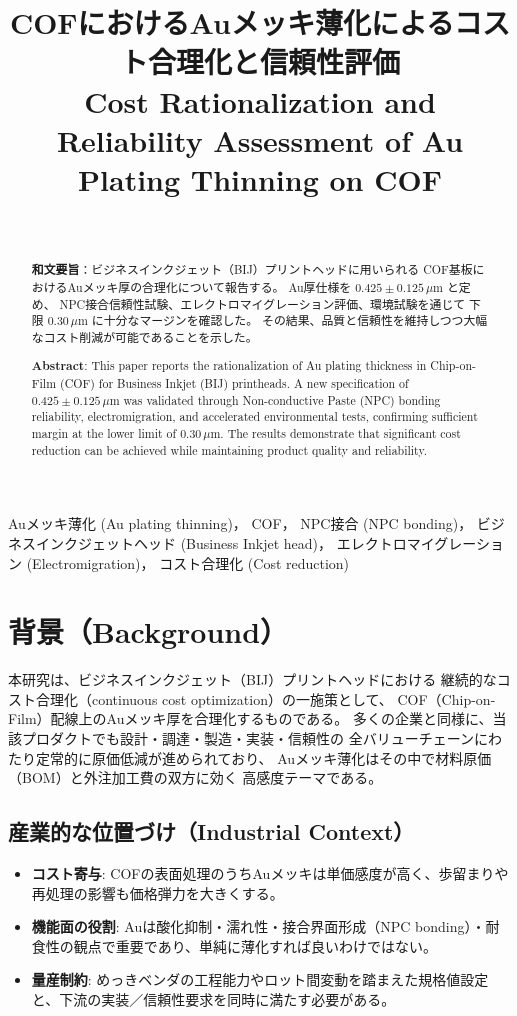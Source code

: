 \documentclass[conference]{IEEEtran}
\title{COFにおけるAuメッキ薄化によるコスト合理化と信頼性評価\\
\large Cost Rationalization and Reliability Assessment of Au Plating Thinning on COF}
\author{%
  \IEEEauthorblockN{三溝 真一（Shinichi Samizo)}\\
  \IEEEauthorblockA{独立系半導体研究者（元セイコーエプソン）\\
  Email: \href{mailto:shin3t72@gmail.com}{shin3t72@gmail.com}\\
  GitHub: \url{https://github.com/Samizo-AITL}}%
}
\begin{document}
\maketitle

\begin{abstract}
\textbf{和文要旨}：ビジネスインクジェット（BIJ）プリントヘッドに用いられる
COF基板におけるAuメッキ厚の合理化について報告する。
Au厚仕様を $0.425 \pm 0.125\,\mu$m と定め、
NPC接合信頼性試験、エレクトロマイグレーション評価、環境試験を通じて
下限 $0.30\,\mu$m に十分なマージンを確認した。
その結果、品質と信頼性を維持しつつ大幅なコスト削減が可能であることを示した。

\medskip
\textbf{Abstract}: This paper reports the rationalization of Au plating thickness
in Chip-on-Film (COF) for Business Inkjet (BIJ) printheads.
A new specification of $0.425 \pm 0.125\,\mu$m was validated
through Non-conductive Paste (NPC) bonding reliability, electromigration,
and accelerated environmental tests, confirming sufficient margin at the lower limit of $0.30\,\mu$m.
The results demonstrate that significant cost reduction can be achieved
while maintaining product quality and reliability.
\end{abstract}

\begin{IEEEkeywords}
Auメッキ薄化 (Au plating thinning)，
COF，
NPC接合 (NPC bonding)，
ビジネスインクジェットヘッド (Business Inkjet head)，
エレクトロマイグレーション (Electromigration)，
コスト合理化 (Cost reduction)
\end{IEEEkeywords}

\section{背景（Background）}
本研究は、ビジネスインクジェット（BIJ）プリントヘッドにおける
継続的なコスト合理化（continuous cost optimization）の一施策として、
COF（Chip-on-Film）配線上のAuメッキ厚を合理化するものである。
多くの企業と同様に、当該プロダクトでも設計・調達・製造・実装・信頼性の
全バリューチェーンにわたり定常的に原価低減が進められており、
Auメッキ薄化はその中で材料原価（BOM）と外注加工費の双方に効く
高感度テーマである。

\subsection*{産業的な位置づけ（Industrial Context）}
\begin{itemize}
  \item \textbf{コスト寄与}: COFの表面処理のうちAuメッキは単価感度が高く、歩留まりや再処理の影響も価格弾力を大きくする。
  \item \textbf{機能面の役割}: Auは酸化抑制・濡れ性・接合界面形成（NPC bonding）・耐食性の観点で重要であり、単純に薄化すれば良いわけではない。
  \item \textbf{量産制約}: めっきベンダの工程能力やロット間変動を踏まえた規格値設定と、下流の実装／信頼性要求を同時に満たす必要がある。
\end{itemize}
\end{document}
